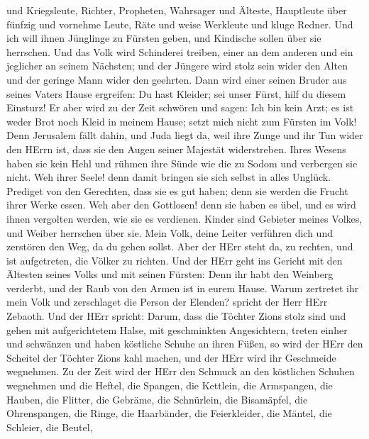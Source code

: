 und Kriegsleute, Richter, Propheten, Wahrsager und Älteste, 
Hauptleute über fünfzig und vornehme Leute, Räte und weise Werkleute und
kluge Redner.  Und ich will ihnen Jünglinge zu Fürsten
geben, und Kindische sollen über sie herrschen.  Und das
Volk wird Schinderei treiben, einer an dem anderen und ein jeglicher an
seinem Nächsten; und der Jüngere wird stolz sein wider den Alten und der
geringe Mann wider den geehrten.  Dann wird einer seinen
Bruder aus seines Vaters Hause ergreifen: Du hast Kleider; sei unser
Fürst, hilf du diesem Einsturz!  Er aber wird zu der Zeit
schwören und sagen: Ich bin kein Arzt; es ist weder Brot noch Kleid in
meinem Hause; setzt mich nicht zum Fürsten im Volk!  Denn
Jerusalem fällt dahin, und Juda liegt da, weil ihre Zunge und ihr Tun
wider den HErrn ist, dass sie den Augen seiner Majestät widerstreben.
 Ihres Wesens haben sie kein Hehl und rühmen ihre Sünde wie
die zu Sodom und verbergen sie nicht. Weh ihrer Seele! denn damit
bringen sie sich selbst in alles Unglück.  Prediget von den
Gerechten, dass sie es gut haben; denn sie werden die Frucht ihrer Werke
essen.  Weh aber den Gottlosen! denn sie haben es übel, und
es wird ihnen vergolten werden, wie sie es verdienen. 
Kinder sind Gebieter meines Volkes, und Weiber herrschen über sie. Mein
Volk, deine Leiter verführen dich und zerstören den Weg, da du gehen
sollst.  Aber der HErr steht da, zu rechten, und ist
aufgetreten, die Völker zu richten.  Und der HErr geht ins
Gericht mit den Ältesten seines Volks und mit seinen Fürsten: Denn ihr
habt den Weinberg verderbt, und der Raub von den Armen ist in eurem
Hause.  Warum zertretet ihr mein Volk und zerschlaget die
Person der Elenden? spricht der Herr HErr Zebaoth.  Und der
HErr spricht: Darum, dass die Töchter Zions stolz sind und gehen mit
aufgerichtetem Halse, mit geschminkten Angesichtern, treten einher und
schwänzen und haben köstliche Schuhe an ihren Füßen,  so
wird der HErr den Scheitel der Töchter Zions kahl machen, und der HErr
wird ihr Geschmeide wegnehmen.  Zu der Zeit wird der HErr
den Schmuck an den köstlichen Schuhen wegnehmen und die Heftel, die
Spangen,  die Kettlein, die Armspangen, die Hauben,
 die Flitter, die Gebräme, die Schnürlein, die Bisamäpfel,
die Ohrenspangen,  die Ringe, die Haarbänder, 
die Feierkleider, die Mäntel, die Schleier, die Beutel, 
